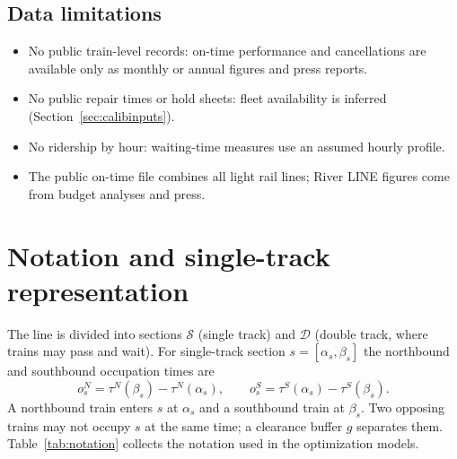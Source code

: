 \documentclass[11pt]{article}
\begin{document}
\subsection{Data limitations}
\begin{itemize}
\item No public train-level records: on-time performance and cancellations are available only as monthly or annual figures and press reports.
\item No public repair times or hold sheets: fleet availability is inferred (Section~\ref{sec:calibinputs}).
\item No ridership by hour: waiting-time measures use an assumed hourly profile.
\item The public on-time file combines all light rail lines; River LINE figures come from budget analyses and press.
\end{itemize}

\section{Notation and single-track representation}\label{sec:notation}
The line is divided into sections $\mathcal{S}$ (single track) and $\mathcal{D}$ (double track, where trains may pass and wait). For single-track section $s=[\alpha_s,\beta_s]$ the northbound and southbound occupation times are
\[o^N_s=\tau^N(\beta_s)-\tau^N(\alpha_s),\qquad o^S_s=\tau^S(\alpha_s)-\tau^S(\beta_s).\]
A northbound train enters $s$ at $\alpha_s$ and a southbound train at $\beta_s$. Two opposing trains may not occupy $s$ at the same time; a clearance buffer $g$ separates them. Table~\ref{tab:notation} collects the notation used in the optimization models.
\end{document}
